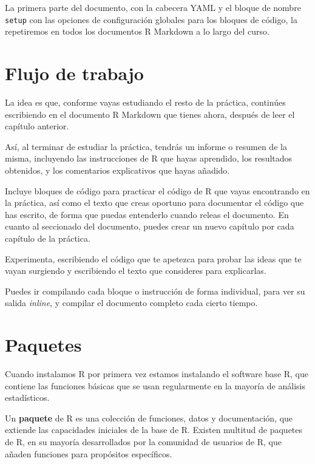 \documentclass[
  title=normal,
  notoc,
  bib=normal]{mnye}
\begin{document}
La primera parte del documento, con la cabecera YAML y el bloque de nombre \texttt{setup} con las opciones de configuración globales para los bloques de código, la repetiremos en todos los documentos R Markdown a lo largo del curso.

\hypertarget{flow}{%
\section{Flujo de trabajo}\label{flow}}

La idea es que, conforme vayas estudiando el resto de la práctica, continúes escribiendo en el documento R Markdown que tienes ahora, después de leer el capítulo anterior.

Así, al terminar de estudiar la práctica, tendrás un informe o resumen de la misma, incluyendo las instrucciones de \textsf{R} que hayas aprendido, los resultados obtenidos, y los comentarios explicativos que hayas añadido.

Incluye bloques de código para practicar el código de \textsf{R} que vayas encontrando en la práctica, así como el texto que creas oportuno para documentar el código que has escrito, de forma que puedas entenderlo cuando releas el documento. En cuanto al seccionado del documento, puedes crear un nuevo capítulo por cada capítulo de la práctica.

Experimenta, escribiendo el código que te apetezca para probar las ideas que te vayan surgiendo y escribiendo el texto que consideres para explicarlas.

Puedes ir compilando cada bloque o instrucción de forma individual, para ver su salida \emph{inline}, y compilar el documento completo cada cierto tiempo.

\hypertarget{packages}{%
\section{Paquetes}\label{packages}}

Cuando instalamos \textsf{R} por primera vez estamos instalando el software \textsf{base R}, que contiene las funciones básicas que se usan regularmente en la mayoría de análisis estadísticos.

Un \textbf{paquete} de R es una colección de funciones, datos y documentación, que extiende las capacidades iniciales de la base de \textsf{R}. Existen multitud de paquetes de \textsf{R}, en su mayoría desarrollados por la comunidad de usuarios de \textsf{R}, que añaden funciones para propósitos específicos.
\end{document}
